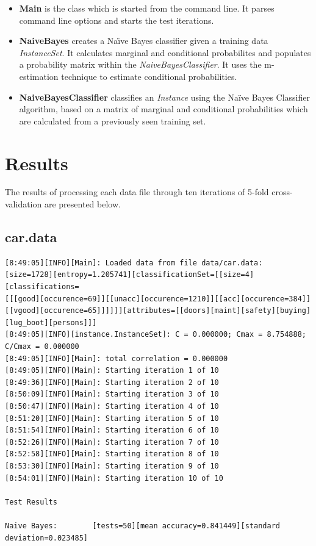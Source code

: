 \documentclass[10pt]{report}
\begin{document}
\begin{itemize}
\item \textbf{Main} is the class which is started from the command
  line. It parses command line options and starts the test iterations.

\item \textbf{NaiveBayes} creates a Na\"{\i}ve Bayes classifier
  given a training data \textit{InstanceSet}. It calculates marginal
  and conditional probabilites and populates a probability matrix
  within the \textit{NaiveBayesClassifier}. It uses the m-estimation
  technique to estimate conditional probabilities.

\item \textbf{NaiveBayesClassifier} classifies an \textit{Instance}
  using the Na\"{i}ve Bayes Classifier algorithm, based on a matrix of
  marginal and conditional probabilities which are calculated from a
  previously seen training set.

\end{itemize}


\section{Results}
\label{sec:results}
The results of processing each data file through ten iterations of
5-fold cross-validation are presented below. 

\subsection*{car.data}
{\small
\begin{verbatim}
[8:49:05][INFO][Main]: Loaded data from file data/car.data:
[size=1728][entropy=1.205741][classificationSet=[[size=4][classifications=
[[[good][occurence=69]][[unacc][occurence=1210]][[acc][occurence=384]]
[[vgood][occurence=65]]]]]][attributes=[[doors][maint][safety][buying][lug_boot][persons]]] 
[8:49:05][INFO][instance.InstanceSet]: C = 0.000000; Cmax = 8.754888; C/Cmax = 0.000000 
[8:49:05][INFO][Main]: total correlation = 0.000000 
[8:49:05][INFO][Main]: Starting iteration 1 of 10 
[8:49:36][INFO][Main]: Starting iteration 2 of 10 
[8:50:09][INFO][Main]: Starting iteration 3 of 10 
[8:50:47][INFO][Main]: Starting iteration 4 of 10 
[8:51:20][INFO][Main]: Starting iteration 5 of 10 
[8:51:54][INFO][Main]: Starting iteration 6 of 10 
[8:52:26][INFO][Main]: Starting iteration 7 of 10 
[8:52:58][INFO][Main]: Starting iteration 8 of 10 
[8:53:30][INFO][Main]: Starting iteration 9 of 10 
[8:54:01][INFO][Main]: Starting iteration 10 of 10 

Test Results

Naive Bayes:		[tests=50][mean accuracy=0.841449][standard deviation=0.023485] 
\end{verbatim}
}
\end{document}
